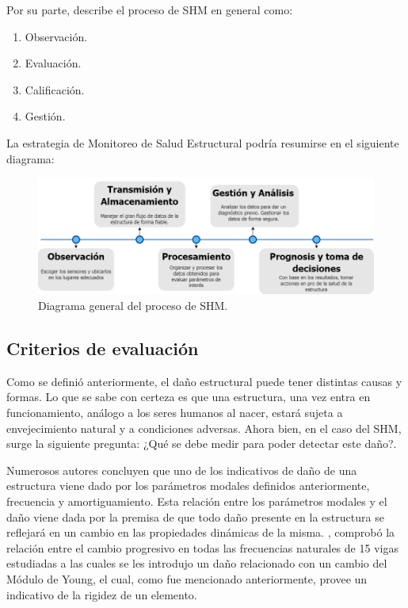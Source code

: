 Por su parte, \citet{chen2018} describe el proceso de SHM en general como:

\begin{enumerate}
    \item Observación.
    \item Evaluación.
    \item Calificación.
    \item Gestión.
\end{enumerate}

La estrategia de Monitoreo de Salud Estructural podría resumirse en el siguiente diagrama:

\begin{figure}[H]
    \centering
    \includegraphics[width = \textwidth]{imagenes/cap1_marcoteo/Diagrama SHM timeline.png}
    \caption{Diagrama general del proceso de SHM.}
    \label{fig:diag_SHM}
\end{figure}

\subsection{Criterios de evaluación}

Como se definió anteriormente, el daño estructural puede tener distintas causas y formas. Lo que se sabe con certeza es que una estructura, una vez entra en funcionamiento, análogo a los seres humanos al nacer, estará sujeta a envejecimiento natural y a condiciones adversas. Ahora bien, en el caso del SHM, surge la siguiente pregunta: ¿Qué se debe medir para poder detectar este daño?. 

Numerosos autores concluyen que uno de los indicativos de daño de una estructura viene dado por los parámetros modales definidos anteriormente, frecuencia y amortiguamiento. Esta relación entre los parámetros modales y el daño viene dada por la premisa de que todo daño presente en la estructura se reflejará en un cambio en las propiedades dinámicas de la misma. \citet{worden2009modal}, comprobó la relación entre el cambio progresivo en todas las frecuencias naturales de 15 vigas estudiadas a las cuales se les introdujo un daño relacionado con un cambio del Módulo de Young, el cual, como fue mencionado anteriormente, provee un indicativo de la rigidez de un elemento.

